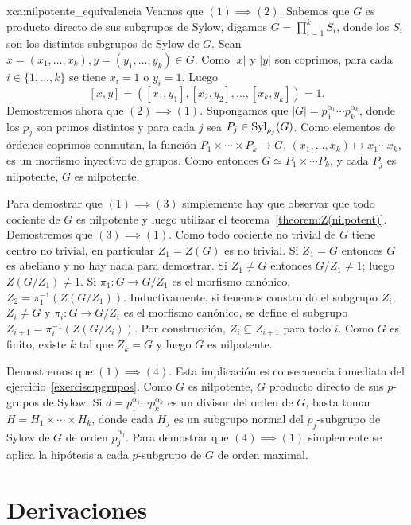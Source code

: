 \begin{sol}{xca:nilpotente_equivalencia}
	Veamos que $(1)\implies(2)$. Sabemos que $G$ es producto directo de sus
	subgrupos de Sylow, digamos $G=\prod_{i=1}^k S_i$, donde los $S_i$ son los
	distintos subgrupos de Sylow de $G$.  Sean
	$x=(x_1,\dots,x_k),y=(y_1,\dots,y_k)\in G$. Como $|x|$ y $|y|$ son
	coprimos, para cada $i\in\{1,\dots,k\}$ se tiene $x_i=1$ o $y_i=1$. Luego
	\[
		[x,y]=([x_1,y_1],[x_2,y_2],\dots,[x_k,y_k])=1. 
	\]
	Demostremos ahora que $(2)\implies(1)$. Supongamos que
	$|G|=p_1^{\alpha_1}\cdots p_k^{\alpha_k}$, donde los $p_j$ son primos
	distintos y para cada $j$ sea $P_j\in\mathrm{Syl}_{p_j}(G)$. Como elementos de
	órdenes coprimos conmutan, la función $P_1\times\cdots\times P_k\to G$,
	$(x_1,\dots,x_k)\mapsto x_1\cdots x_k$, es un morfismo inyectivo de grupos.
	Como entonces $G\simeq P_1\times\cdots P_k$, y cada $P_j$ es nilpotente,
	$G$ es nilpotente. 

	Para demostrar que $(1)\implies(3)$ simplemente hay que observar que todo
	cociente de $G$ es nilpotente y luego utilizar el
	teorema~\ref{theorem:Z(nilpotent)}. Demostremos que $(3)\implies(1)$. Como
	todo cociente no trivial de $G$ tiene centro no trivial, en particular
	$Z_1=Z(G)$ es no trivial. Si $Z_1=G$ entonces $G$ es abeliano y no hay nada
	para demostrar. Si $Z_1\ne G$ entonces $G/Z_1\ne 1$; luego $Z(G/Z_1)\ne 1$.
	Si $\pi_1\colon G\to G/Z_1$ es el morfismo canónico,
	$Z_2=\pi_1^{-1}(Z(G/Z_1))$. Inductivamente, si tenemos construido el
	subgrupo $Z_i$, $Z_i\ne G$ y  $\pi_i\colon G\to G/Z_{i}$ es el morfismo
	canónico, se define el subgrupo $Z_{i+1}=\pi_i^{-1}(Z(G/Z_i))$. Por
	construcción, $Z_i\subseteq Z_{i+1}$ para todo $i$. Como $G$ es finito,
	existe $k$ tal que $Z_k=G$ y luego $G$ es nilpotente.

	Demostremos que $(1)\implies(4)$. Esta implicación es consecuencia
	inmediata del ejercicio~\ref{exercise:pgrupos}. 
	Como $G$ es nilpotente, $G$ producto
	directo de sus $p$-grupos de Sylow. Si $d=p_1^{\alpha_1}\cdots
	p_k^{\alpha_k}$ es un divisor del orden de $G$, basta tomar
	$H=H_1\times\cdots\times H_k$, 
	donde cada $H_j$ es un subgrupo normal del $p_j$-subgrupo de Sylow de $G$
	de orden $p_j^{\alpha_j}$. Para demostrar que $(4)\implies(1)$ simplemente
	se aplica la hipótesis a cada $p$-subgrupo de $G$ de orden maximal.
\end{sol}

\section*{Derivaciones}


